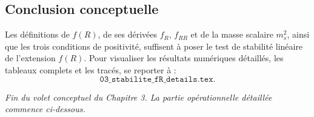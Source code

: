 \subsection{Conclusion conceptuelle}
Les définitions de \(f(R)\), de ses dérivées \(f_{R}\), \(f_{RR}\) et de la masse scalaire \(m_{s}^{2}\), ainsi que les trois conditions de positivité, suffisent à poser le test de stabilité linéaire de l’extension $f(R)$.  
Pour visualiser les résultats numériques détaillés, les tableaux complets et les tracés, se reporter à :
\[
  \texttt{03\_stabilite\_fR\_details.tex}.
\]

\noindent\emph{Fin du volet conceptuel du Chapitre 3. La partie opérationnelle détaillée commence ci-dessous.}